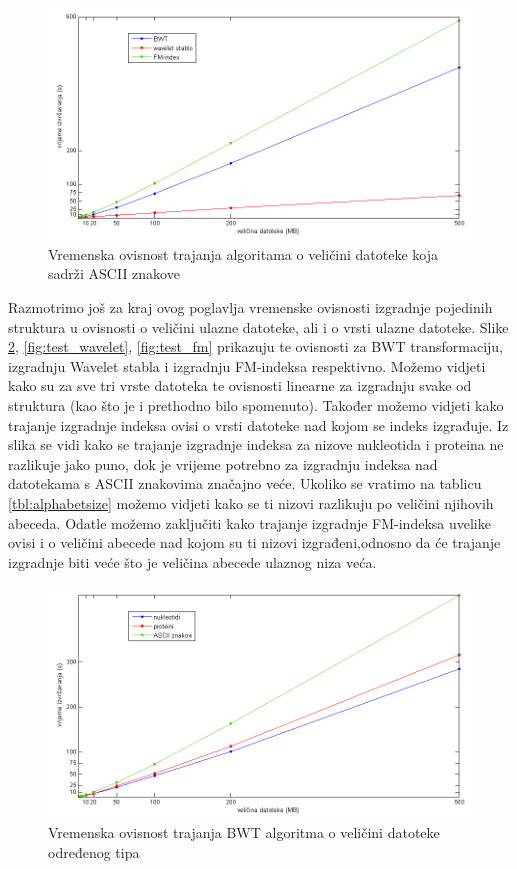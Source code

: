 \begin{figure}[h]
   \centering
       \includegraphics[width=\textwidth]{./pictures/test_ascii.png}
 \caption{Vremenska ovisnost trajanja algoritama o veličini datoteke koja sadrži ASCII znakove}
 \label{fig:test_ascii}
\end{figure}


Razmotrimo još za kraj ovog poglavlja vremenske ovisnosti izgradnje pojedinih struktura u ovisnosti o veličini ulazne datoteke, ali i o vrsti ulazne datoteke. Slike \ref{fig:test_bwt}, \ref{fig:test_wavelet}, \ref{fig:test_fm} prikazuju te ovisnosti za BWT transformaciju, izgradnju Wavelet stabla i izgradnju FM-indeksa respektivno. Možemo vidjeti kako su za sve tri vrste datoteka te ovisnosti linearne za izgradnju svake od struktura (kao što je i prethodno bilo spomenuto). Također možemo vidjeti kako trajanje izgradnje indeksa ovisi o vrsti datoteke nad kojom se indeks izgrađuje. Iz slika se vidi kako se trajanje izgradnje indeksa za nizove nukleotida i proteina ne razlikuje jako puno, dok je vrijeme potrebno za izgradnju indeksa nad datotekama s ASCII znakovima značajno veće. Ukoliko se vratimo na tablicu \ref{tbl:alphabetsize} možemo vidjeti kako se ti nizovi razlikuju po veličini njihovih abeceda. Odatle možemo zaključiti kako trajanje izgradnje FM-indeksa uvelike ovisi i o veličini abecede nad kojom su ti nizovi izgrađeni,odnosno da će trajanje izgradnje biti veće što je veličina abecede ulaznog niza veća.


\begin{figure}[H]
   \centering
       \includegraphics[width=\textwidth]{./pictures/test_bwt.png}
 \caption{Vremenska ovisnost trajanja BWT algoritma o veličini datoteke određenog tipa}
 \label{fig:test_bwt}
\end{figure}

